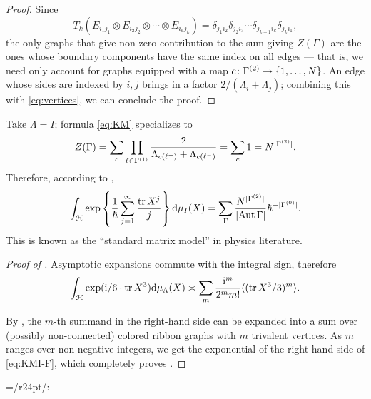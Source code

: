 \begin{proof}
  Since
  \begin{equation}\label{eq:vertices}
    T_k(E_{i_1j_1}\otimes E_{i_2j_2}\otimes\cdots\otimes
    E_{i_{k}j_k})=\delta_{j_1i_2}\delta_{j_2i_3}\cdots
    \delta_{j_{k-1}i_k}\delta_{j_ki_1},
  \end{equation}
  the only graphs that give non-zero contribution to the sum giving
  $Z(\Gamma)$ are the ones whose boundary components have the same index on
  all edges --- that is, we need only account for graphs equipped with
  a map $c\colon\Holes{\Gamma} \to \{1, \dots, N\}$.  An edge whose sides are
  indexed by $i,j$ brings in a factor $2/(\Lambda_i+\Lambda_j)$; combining this
  with \eqref{eq:vertices}, we can conclude the proof.
\end{proof}

\begin{example}
  Take $\Lambda = I$; formula \eqref{eq:KM} specializes to 
  \begin{equation*}
    Z(\Gamma) = \sum_{c} \prod_{\ell\in \Edges{\Gamma}} \frac{2}{\Lambda_{c(\ell^+)} +
      \Lambda_{c(\ell^-)}}
    = \sum_c 1 = N^{\card{\Holes{\Gamma}}}. 
  \end{equation*}
  Therefore, according to ,
  \begin{equation}
    \int_{\Hermitian[N]} \exp \left\{ \frac{1}{\hbar}\sum_{j=1}^{\infty}
      \frac{\tr X^j}{j}
    \right\} \ud\mu_I(X) = 
    \sum_\Gamma \frac{N^{\card{\Holes{\Gamma}}}} {\card{\Aut
        \Gamma}}\hbar^{-\card{\Vertices{\Gamma}}}. 
  \end{equation}
  This is known as the ``standard matrix model'' in physics
  literature. 
\end{example}

\begin{proof}[Proof of ]
  Asymptotic expansions commute with the integral sign, therefore
  \begin{equation*}
    \int_{\Hn} \exp (\I/6 \cdot \tr X^3) \ud\mu_\Lambda(X) \asymp \sum_m
    \frac{\I^m}{2^mm!} \correlator{(\tr
      X^3/3)^m}. 
  \end{equation*}
  
  By , the $m$-th summand in the right-hand side
  can be expanded into a sum over (possibly non-connected) colored
  ribbon graphs with $m$ trivalent vertices. As $m$ ranges over
  non-negative integers, we get the exponential of the right-hand side
  of \eqref{eq:KMI-F}, which completely proves . 
\end{proof}

\everyxy={/r24pt/:} %

